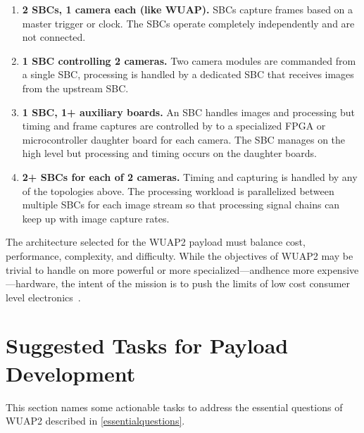 \documentclass[conference]{IEEEtran} %
\begin{document}
\begin{enumerate}
    \item \textbf{2 SBCs, 1 camera each (like WUAP).} SBCs capture frames based on a master trigger or clock. The SBCs operate completely independently and are not connected.
    \item \textbf{1 SBC controlling 2 cameras.} Two camera modules are commanded from a single SBC, processing is handled by a dedicated SBC that receives images from the upstream SBC.
    \item \textbf{1 SBC, 1+ auxiliary boards.} An SBC handles images and processing but timing and frame captures are controlled by to a specialized FPGA or microcontroller daughter board for each camera. The SBC manages on the high level but processing and timing occurs on the daughter boards.
    \item \textbf{2+ SBCs for each of 2 cameras.} Timing and capturing is handled by any of the topologies above. The processing workload is parallelized between multiple SBCs for each image stream so that processing signal chains can keep up with image capture rates.
\end{enumerate}

The architecture selected for the WUAP2 payload must balance cost, performance, complexity, and difficulty.
While the objectives of WUAP2 may be trivial to handle on more powerful or more specialized---andhence more expensive---hardware, the intent of the mission is to push the limits of low cost consumer level electronics~\cite{habcvpdd}.

\section{Suggested Tasks for Payload Development}
This section names some actionable tasks to address the essential questions of WUAP2 described in \autoref{essentialquestions}.
\end{document}
